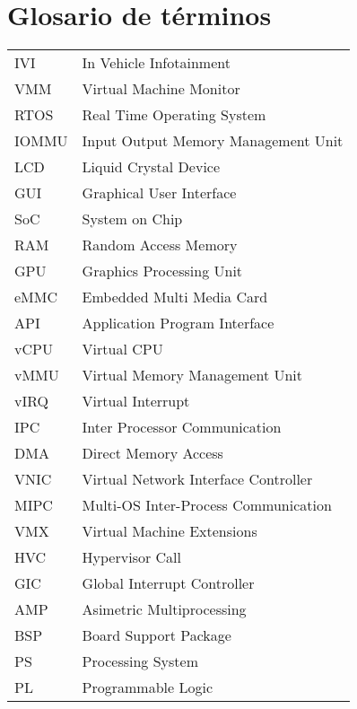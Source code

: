 \section{Glosario de términos}

\begin{tabular}{l l}
  IVI    & In Vehicle Infotainment \\
  VMM    & Virtual Machine Monitor \\
  RTOS   & Real Time Operating System \\
  IOMMU  & Input Output Memory Management Unit \\
  LCD    & Liquid Crystal Device \\
  GUI    & Graphical User Interface \\
  SoC    & System on Chip \\
  RAM    & Random Access Memory \\
  GPU    & Graphics Processing Unit \\
  eMMC   & Embedded Multi Media Card \\
  API    & Application Program Interface \\
  vCPU   & Virtual CPU \\
  vMMU   & Virtual Memory Management Unit \\
  vIRQ   & Virtual Interrupt \\
  IPC    & Inter Processor Communication \\
  DMA    & Direct Memory Access \\
  VNIC   & Virtual Network Interface Controller \\
  MIPC   & Multi-OS Inter-Process Communication \\
  VMX    & Virtual Machine Extensions \\
  HVC    & Hypervisor Call \\
  GIC    & Global Interrupt Controller \\
  AMP    & Asimetric Multiprocessing \\
  BSP    & Board Support Package \\
  PS     & Processing System \\
  PL     & Programmable Logic \\ 
\end{tabular}



\newpage
